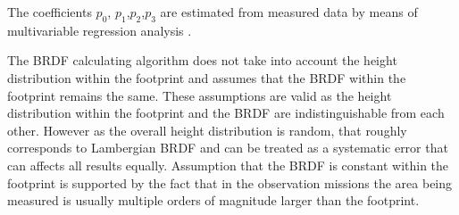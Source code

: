 The coefficients $p_0$, $p_1$,$p_2$,$p_3$ are estimated from measured data by means of multivariable regression analysis \cite{BRDFrob}. 




The BRDF calculating algorithm does not take into account the height distribution within the footprint and assumes that the BRDF within the footprint remains the same. These assumptions are valid as the height distribution within the footprint and the BRDF are indistinguishable from each other. However as the overall height distribution is random, that roughly corresponds to Lambergian BRDF and can be treated as a systematic error that can affects all results equally. Assumption that the BRDF is constant within the footprint is supported by the fact that in the observation missions the area being measured is usually multiple orders of magnitude larger than the footprint.



